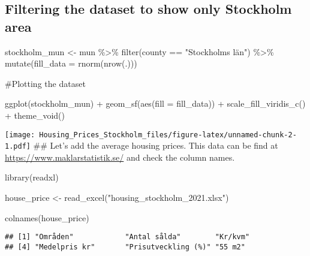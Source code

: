 \documentclass[
]{article}
\newenvironment{Shaded}{\begin{snugshade}}{\end{snugshade}}
\newcommand{\AttributeTok}[1]{\textcolor[rgb]{0.77,0.63,0.00}{#1}}
\newcommand{\FunctionTok}[1]{\textcolor[rgb]{0.00,0.00,0.00}{#1}}
\newcommand{\NormalTok}[1]{#1}
\newcommand{\OtherTok}[1]{\textcolor[rgb]{0.56,0.35,0.01}{#1}}
\newcommand{\SpecialCharTok}[1]{\textcolor[rgb]{0.00,0.00,0.00}{#1}}
\newcommand{\StringTok}[1]{\textcolor[rgb]{0.31,0.60,0.02}{#1}}
\begin{document}
\hypertarget{filtering-the-dataset-to-show-only-stockholm-area}{%
\subsection{Filtering the dataset to show only Stockholm
area}\label{filtering-the-dataset-to-show-only-stockholm-area}}

\begin{Shaded}
\begin{Highlighting}[]
\NormalTok{stockholm\_mun }\OtherTok{\textless{}{-}}\NormalTok{ mun }\SpecialCharTok{\%\textgreater{}\%} 
  \FunctionTok{filter}\NormalTok{(county }\SpecialCharTok{==} \StringTok{"Stockholms län"}\NormalTok{) }\SpecialCharTok{\%\textgreater{}\%} 
  \FunctionTok{mutate}\NormalTok{(}\AttributeTok{fill\_data =} \FunctionTok{rnorm}\NormalTok{(}\FunctionTok{nrow}\NormalTok{(.))) }
\end{Highlighting}
\end{Shaded}

\#Plotting the dataset

\begin{Shaded}
\begin{Highlighting}[]
\FunctionTok{ggplot}\NormalTok{(stockholm\_mun) }\SpecialCharTok{+}
  \FunctionTok{geom\_sf}\NormalTok{(}\FunctionTok{aes}\NormalTok{(}\AttributeTok{fill =}\NormalTok{ fill\_data)) }\SpecialCharTok{+}
  \FunctionTok{scale\_fill\_viridis\_c}\NormalTok{() }\SpecialCharTok{+}
  \FunctionTok{theme\_void}\NormalTok{()}
\end{Highlighting}
\end{Shaded}

\texttt{[image: Housing\_Prices\_Stockholm\_files/figure-latex/unnamed-chunk-2-1.pdf]}
\#\# Let's add the average housing prices. This data can be find at
\url{https://www.maklarstatistik.se/} and check the column names.

\begin{Shaded}
\begin{Highlighting}[]
\FunctionTok{library}\NormalTok{(readxl)}

\NormalTok{house\_price }\OtherTok{\textless{}{-}} \FunctionTok{read\_excel}\NormalTok{(}\StringTok{"housing\_stockholm\_2021.xlsx"}\NormalTok{)}

\FunctionTok{colnames}\NormalTok{(house\_price)}
\end{Highlighting}
\end{Shaded}

\begin{verbatim}
## [1] "Områden"            "Antal sålda"        "Kr/kvm"            
## [4] "Medelpris kr"       "Prisutveckling (%)" "55 m2"
\end{verbatim}
\end{document}
